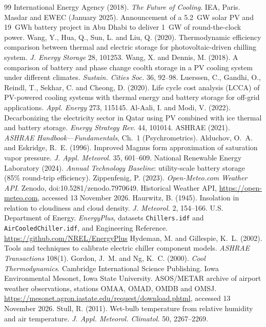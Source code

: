 \documentclass[10pt,a4paper]{article}
\begin{document}
\begin{thebibliography}{99}\small
{} International Energy Agency (2018). \emph{The Future of Cooling}. IEA, Paris.
 Masdar and EWEC (January 2025). Announcement of a 5.2~GW solar PV and 19~GWh battery project in Abu Dhabi to deliver 1~GW of round-the-clock power.
 Wang, Y., Hua, Q., Sun, L. and Liu, Q. (2020). Thermodynamic efficiency comparison between thermal and electric storage for photovoltaic-driven chilling system. \emph{J. Energy Storage} 28, 101253.
 Wang, X. and Dennis, M. (2018). A comparison of battery and phase change coolth storage in a PV cooling system under different climates. \emph{Sustain. Cities Soc.} 36, 92--98.
 Luerssen, C., Gandhi, O., Reindl, T., Sekhar, C. and Cheong, D. (2020). Life cycle cost analysis (LCCA) of PV-powered cooling systems with thermal energy and battery storage for off-grid applications. \emph{Appl. Energy} 273, 115145.
 Al-Aali, I. and Modi, V. (2022). Decarbonizing the electricity sector in Qatar using PV combined with ice thermal and battery storage. \emph{Energy Strategy Rev.} 44, 101014.
 ASHRAE (2021). \emph{ASHRAE Handbook---Fundamentals}, Ch.~1 (Psychrometrics).
 Alduchov, O.~A. and Eskridge, R.~E. (1996). Improved Magnus form approximation of saturation vapor pressure. \emph{J. Appl. Meteorol.} 35, 601--609.
 National Renewable Energy Laboratory (2024). \emph{Annual Technology Baseline}: utility-scale battery storage (85\% round-trip efficiency).
 Zippenfenig, P. (2023). \emph{Open-Meteo.com Weather API}. Zenodo, doi:10.5281/zenodo.7970649. Historical Weather API, \url{https://open-meteo.com}, accessed 13 November 2026.
 Haurwitz, B. (1945). Insolation in relation to cloudiness and cloud density. \emph{J. Meteorol.} 2, 154--166.
 U.S. Department of Energy. \emph{EnergyPlus}, datasets \texttt{Chillers.idf} and \texttt{AirCooledChiller.idf}, and Engineering Reference. \url{https://github.com/NREL/EnergyPlus}
 Hydeman, M. and Gillespie, K.~L. (2002). Tools and techniques to calibrate electric chiller component models. \emph{ASHRAE Transactions} 108(1).
 Gordon, J.~M. and Ng, K.~C. (2000). \emph{Cool Thermodynamics}. Cambridge International Science Publishing.
 Iowa Environmental Mesonet, Iowa State University. ASOS/METAR archive of airport weather observations, stations OMAA, OMAD, OMDB and OMSJ. \url{https://mesonet.agron.iastate.edu/request/download.phtml}, accessed 13 November 2026.
 Stull, R. (2011). Wet-bulb temperature from relative humidity and air temperature. \emph{J. Appl. Meteorol. Climatol.} 50, 2267--2269.
\end{thebibliography}
\end{document}
